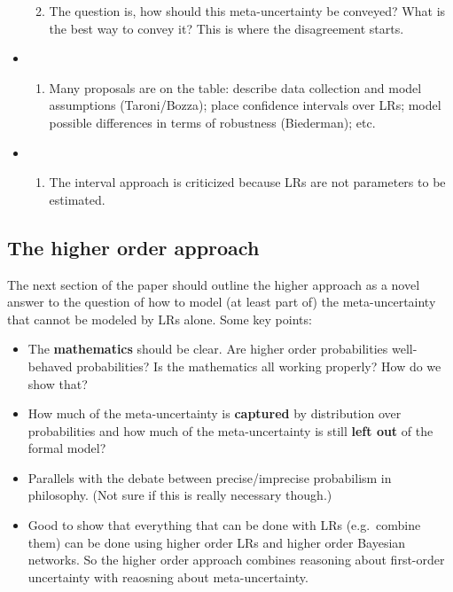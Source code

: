 \documentclass[
  10pt,
  dvipsnames,enabledeprecatedfontcommands]{scrartcl}
\providecommand{\tightlist}{%
  \setlength{\itemsep}{0pt}\setlength{\parskip}{0pt}}
\begin{document}
\begin{itemize}
\begin{enumerate}
  \def\labelenumi{(\roman{enumi})}
  \setcounter{enumi}{2}
  \tightlist
  \item
    The question is, how should this meta-uncertainty be conveyed? What
    is the best way to convey it? This is where the disagreement starts.
  \end{enumerate}
\item
  \begin{enumerate}
  \def\labelenumi{(\roman{enumi})}
  \setcounter{enumi}{3}
  \tightlist
  \item
    Many proposals are on the table: describe data collection and model
    assumptions (Taroni/Bozza); place confidence intervals over LRs;
    model possible differences in terms of robustness (Biederman); etc.
  \end{enumerate}
\item
  \begin{enumerate}
  \def\labelenumi{(\alph{enumi})}
  \setcounter{enumi}{21}
  \tightlist
  \item
    The interval approach is criticized because LRs are not parameters
    to be estimated.
  \end{enumerate}
\end{itemize}

\hypertarget{the-higher-order-approach}{%
\subsection{The higher order approach}\label{the-higher-order-approach}}

The next section of the paper should outline the higher approach as a
novel answer to the question of how to model (at least part of) the
meta-uncertainty that cannot be modeled by LRs alone. Some key points:

\begin{itemize}
\item
  The \textbf{mathematics} should be clear. Are higher order
  probabilities well-behaved probabilities? Is the mathematics all
  working properly? How do we show that?
\item
  How much of the meta-uncertainty is \textbf{captured} by distribution
  over probabilities and how much of the meta-uncertainty is still
  \textbf{left out} of the formal model?
\item
  Parallels with the debate between precise/imprecise probabilism in
  philosophy. (Not sure if this is really necessary though.)
\item
  Good to show that everything that can be done with LRs (e.g.~combine
  them) can be done using higher order LRs and higher order Bayesian
  networks. So the higher order approach combines reasoning about
  first-order uncertainty with reaosning about meta-uncertainty.
\end{itemize}
\end{document}
